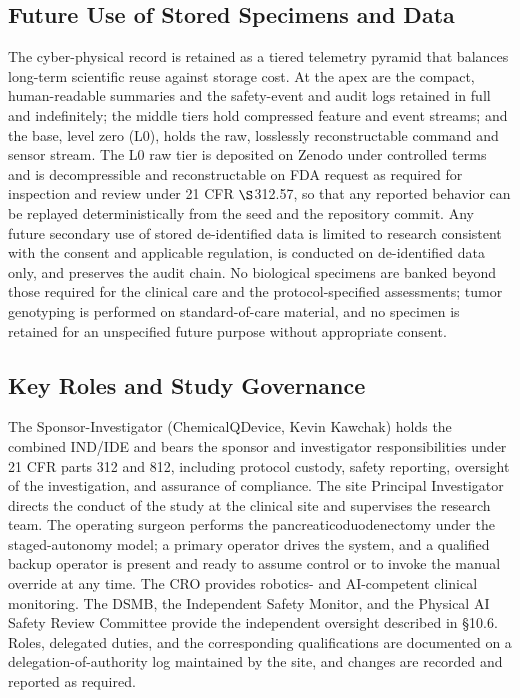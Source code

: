 \subsection{Future Use of Stored Specimens and Data}

The cyber-physical record is retained as a tiered telemetry pyramid that balances
long-term scientific reuse against storage cost. At the apex are the compact,
human-readable summaries and the safety-event and audit logs retained in full and
indefinitely; the middle tiers hold compressed feature and event streams; and the
base, level zero (L0), holds the raw, losslessly reconstructable command and
sensor stream. The L0 raw tier is deposited on Zenodo under controlled terms and
is decompressible and reconstructable on FDA request as required for inspection
and review under 21 CFR $\S$312.57, so that any reported behavior can be replayed
deterministically from the seed and the repository commit. Any future secondary
use of stored de-identified data is limited to research consistent with the
consent and applicable regulation, is conducted on de-identified data only, and
preserves the audit chain. No biological specimens are banked beyond those required
for the clinical care and the protocol-specified assessments; tumor genotyping is
performed on standard-of-care material, and no specimen is retained for an
unspecified future purpose without appropriate consent.

\subsection{Key Roles and Study Governance}

The Sponsor-Investigator (ChemicalQDevice, Kevin Kawchak) holds the combined
IND/IDE and bears the sponsor and investigator responsibilities under 21 CFR parts
312 and 812, including protocol custody, safety reporting, oversight of the
investigation, and assurance of compliance. The site Principal Investigator
directs the conduct of the study at the clinical site and supervises the research
team. The operating surgeon performs the pancreaticoduodenectomy under the
staged-autonomy model; a primary operator drives the system, and a qualified
backup operator is present and ready to assume control or to invoke the manual
override at any time. The CRO provides robotics- and AI-competent clinical
monitoring. The DSMB, the Independent Safety Monitor, and the Physical AI Safety
Review Committee provide the independent oversight described in \S10.6. Roles,
delegated duties, and the corresponding qualifications are documented on a
delegation-of-authority log maintained by the site, and changes are recorded and
reported as required.


